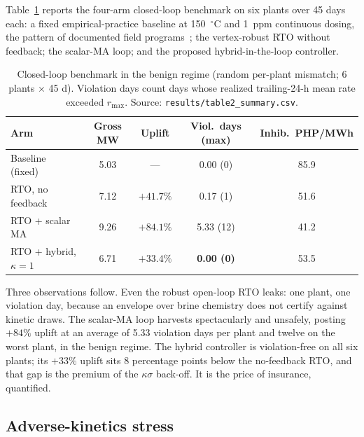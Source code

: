 \documentclass[review,number,sort&compress]{elsarticle}
\begin{document}
Table~\ref{tab:control} reports the four-arm closed-loop benchmark on
six plants over 45 days each: a fixed empirical-practice baseline at
150~$^{\circ}$C and 1~ppm continuous dosing, the pattern of documented
field programs~\citep{baltazar2014grc}; the vertex-robust RTO without
feedback; the scalar-MA loop; and the proposed hybrid-in-the-loop
controller.
\begin{table}[t]\centering
\caption{Closed-loop benchmark in the benign regime (random per-plant
mismatch; 6 plants $\times$ 45 d). Violation days count days whose
realized trailing-24-h mean rate exceeded $r_{\max}$.
Source: \texttt{results/table2\_summary.csv}.}
\label{tab:control}
\begin{tabular}{lcccc}
\toprule
Arm & Gross MW & Uplift & Viol.\ days (max) & Inhib.\ PHP/MWh \\
\midrule
Baseline (fixed) & 5.03 & --- & 0.00 (0) & 85.9 \\
RTO, no feedback & 7.12 & $+41.7\%$ & 0.17 (1) & 51.6 \\
RTO + scalar MA & 9.26 & $+84.1\%$ & 5.33 (12) & 41.2 \\
RTO + hybrid, $\kappa{=}1$ & 6.71 & $+33.4\%$ & \textbf{0.00 (0)} & 53.5 \\
\bottomrule
\end{tabular}
\end{table}
Three observations follow. Even the robust open-loop RTO leaks: one
plant, one violation day, because an envelope over brine chemistry does
not certify against kinetic draws. The scalar-MA loop harvests
spectacularly and unsafely, posting $+84\%$ uplift at an average of
5.33 violation days per plant and twelve on the worst plant, in the
benign regime. The hybrid controller is violation-free on all six
plants; its $+33\%$ uplift sits 8 percentage points below the
no-feedback RTO, and that gap is the premium of the $\kappa\sigma$
back-off. It is the price of insurance, quantified.

\subsection{Adverse-kinetics stress}\label{sec:stress}
\end{document}
